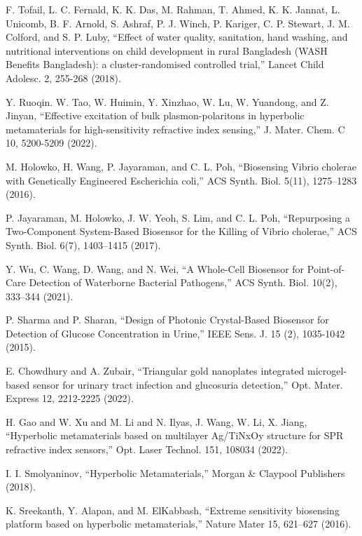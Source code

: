 \documentclass[conference]{IEEEtran}
\begin{document}
\balance
\begin{thebibliography}{00}
 F. Tofail, L. C. Fernald, K. K. Das, M. Rahman, T. Ahmed, K. K. Jannat, L. Unicomb, B. F. Arnold, S. Ashraf, P. J. Winch, P. Kariger, C. P. Stewart, J. M. Colford, and S. P. Luby, ``Effect of water quality, sanitation, hand washing, and nutritional interventions on child development in rural Bangladesh (WASH Benefits Bangladesh): a cluster-randomised controlled trial,'' Lancet Child Adolesc. 2, 255-268 (2018).

 Y. Ruoqin. W. Tao, W. Huimin, Y. Xinzhao, W. Lu, W. Yuandong, and Z. Jinyan, ``Effective excitation of bulk plasmon-polaritons in hyperbolic metamaterials for high-sensitivity refractive index sensing,'' J. Mater. Chem. C 10, 5200-5209 (2022).

 M. Holowko, H. Wang, P. Jayaraman, and C. L. Poh, ``Biosensing Vibrio cholerae with Genetically Engineered Escherichia coli,'' ACS Synth. Biol. 5(11), 1275–1283 (2016).

 P. Jayaraman, M. Holowko, J. W. Yeoh, S. Lim, and C. L. Poh, ``Repurposing a Two-Component System-Based Biosensor for the Killing of Vibrio cholerae,'' ACS Synth. Biol. 6(7), 1403–1415 (2017).

 Y. Wu, C. Wang, D. Wang, and N. Wei, ``A Whole-Cell Biosensor for Point-of-Care Detection of Waterborne Bacterial Pathogens,'' ACS Synth. Biol. 10(2), 333–344 (2021).

 P. Sharma and P. Sharan, ``Design of Photonic Crystal-Based Biosensor for Detection of Glucose Concentration in Urine,'' IEEE Sens. J. 15 (2), 1035-1042 (2015).

 E. Chowdhury and A. Zubair, ``Triangular gold nanoplates integrated microgel-based sensor for urinary tract infection and glucosuria detection,'' Opt. Mater. Express 12, 2212-2225 (2022).

 H. Gao and W. Xu and M. Li and N. Ilyas, J. Wang, W. Li, X. Jiang, ``Hyperbolic metamaterials based on multilayer Ag/TiNxOy structure for SPR refractive index sensors,'' Opt. Laser Technol. 151, 108034 (2022).

 I. I. Smolyaninov, ``Hyperbolic Metamaterials,'' Morgan \& Claypool Publishers (2018).

 K. Sreekanth, Y. Alapan, and M. ElKabbash, ``Extreme sensitivity biosensing platform based on hyperbolic metamaterials,'' Nature Mater 15, 621–627 (2016).


\end{thebibliography}
\end{document}
